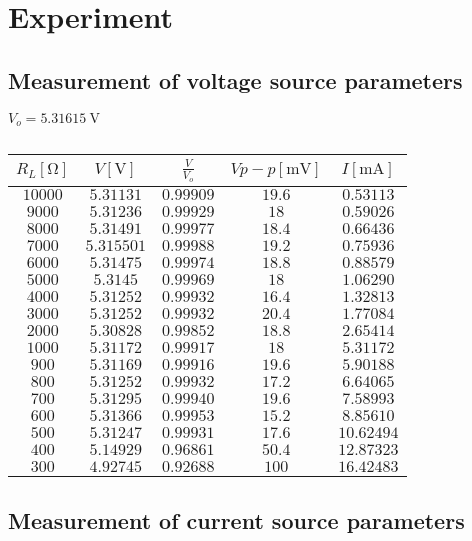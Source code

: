 \section{Experiment}

\subsection{Measurement of voltage source parameters}

$V_o=\SI{5.31615}{\volt}$

\begin{table}[H]
	\centering
	\begin{tabular}{ c | c | c | c | c}
		$R_L [\unit{\ohm}]$ & $V [\unit{\volt}]$ & $\frac{V}{V_o}$ & $Vp-p[\unit{\milli\volt}]$ & $I [\unit{\milli\ampere}]$ \\
		\hline
		$10000$ & $5.31131$ & $0.99909$ & $19.6$ & $0.53113$ \\
		$9000$ & $5.31236$ & $0.99929$ & $18$ & $0.59026$ \\
		$8000$ & $5.31491$ & $0.99977$ & $18.4$ & $0.66436$ \\
		$7000$ & $5.315501$ & $0.99988$ & $19.2$ & $0.75936$ \\
		$6000$ & $5.31475$ & $0.99974$ & $18.8$ & $0.88579$ \\
		$5000$ & $5.3145$ & $0.99969$ & $18$ & $1.06290$ \\
		$4000$ & $5.31252$ & $0.99932$ & $16.4$ & $1.32813$ \\
		$3000$ & $5.31252$ & $0.99932$ & $20.4$ & $1.77084$ \\
		$2000$ & $5.30828$ & $0.99852$ & $18.8$ & $2.65414$ \\
		$1000$ & $5.31172$ & $0.99917$ & $18$ & $5.31172$ \\
		$900$ & $5.31169$ & $0.99916$ & $19.6$ & $5.90188$ \\
		$800$ & $5.31252$ & $0.99932$ & $17.2$ & $6.64065$ \\
		$700$ & $5.31295$ & $0.99940$ & $19.6$ & $7.58993$ \\
		$600$ & $5.31366$ & $0.99953$ & $15.2$ & $8.85610$ \\
		$500$ & $5.31247$ & $0.99931$ & $17.6$ & $10.62494$ \\
		$400$ & $5.14929$ & $0.96861$ & $50.4$ & $12.87323$ \\
		$300$ & $4.92745$ & $0.92688$ & $100$ & $16.42483$ \\ 
	\end{tabular}
	\caption{}
	\label{tab:}
\end{table}


\subsection{Measurement of current source parameters}